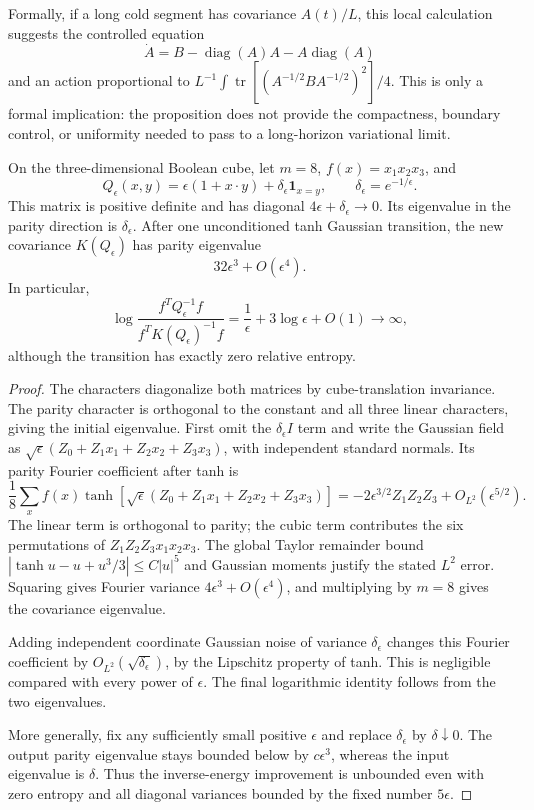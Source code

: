 Formally, if a long cold segment has covariance $A(t)/L$, this local
calculation suggests the controlled equation
\[
 \dot A=B-\operatorname{diag}(A)A-A\operatorname{diag}(A)
\]
and an action proportional to
$L^{-1}\int\operatorname{tr}[(A^{-1/2}BA^{-1/2})^2]/4$.
This is only a formal implication: the proposition does not provide
the compactness, boundary control, or uniformity needed to pass to a
long-horizon variational limit.

\begin{proposition}
\label{prop:critical-singular-mode-obstruction}
On the three-dimensional Boolean cube, let $m=8$,
$f(x)=x_1x_2x_3$, and
\[
 Q_\epsilon(x,y)=\epsilon(1+x\cdot y)+\delta_\epsilon\mathbf1_{x=y},
 \qquad \delta_\epsilon=e^{-1/\epsilon}.
\]
This matrix is positive definite and has diagonal
$4\epsilon+\delta_\epsilon\to0$.
Its eigenvalue in the parity direction is $\delta_\epsilon$.
After one unconditioned tanh Gaussian transition, the new covariance
$K(Q_\epsilon)$ has parity eigenvalue
\[
 32\epsilon^3+O(\epsilon^4).
\]
In particular,
\[
 \log\frac{f^TQ_\epsilon^{-1}f}
               {f^TK(Q_\epsilon)^{-1}f}
 =\frac1\epsilon+3\log\epsilon+O(1)\longrightarrow\infty,
\]
although the transition has exactly zero relative entropy.
\end{proposition}

\begin{proof}
The characters diagonalize both matrices by cube-translation
invariance. The parity character is orthogonal to the constant and
all three linear characters, giving the initial eigenvalue.
First omit the $\delta_\epsilon I$ term and write the Gaussian field
as $\sqrt\epsilon(Z_0+Z_1x_1+Z_2x_2+Z_3x_3)$, with independent
standard normals. Its parity Fourier coefficient after tanh is
\[
 \frac18\sum_x f(x)
   \tanh[\sqrt\epsilon(Z_0+Z_1x_1+Z_2x_2+Z_3x_3)]
 =-2\epsilon^{3/2}Z_1Z_2Z_3+O_{L^2}(\epsilon^{5/2}).
\]
The linear term is orthogonal to parity; the cubic term contributes
the six permutations of $Z_1Z_2Z_3x_1x_2x_3$. The global Taylor
remainder bound $|\tanh u-u+u^3/3|\le C|u|^5$ and Gaussian
moments justify the stated $L^2$ error. Squaring gives Fourier
variance $4\epsilon^3+O(\epsilon^4)$, and multiplying by $m=8$
gives the covariance eigenvalue.

Adding independent coordinate Gaussian noise of variance
$\delta_\epsilon$ changes this Fourier coefficient by
$O_{L^2}(\sqrt{\delta_\epsilon})$, by the Lipschitz property of
tanh. This is negligible compared with every power of $\epsilon$.
The final logarithmic identity follows from the two eigenvalues.

More generally, fix any sufficiently small positive $\epsilon$ and
replace $\delta_\epsilon$ by $\delta\downarrow0$. The output parity
eigenvalue stays bounded below by $c\epsilon^3$, whereas the input
eigenvalue is $\delta$. Thus the inverse-energy improvement is
unbounded even with zero entropy and all diagonal variances bounded
by the fixed number $5\epsilon$.
\end{proof}

